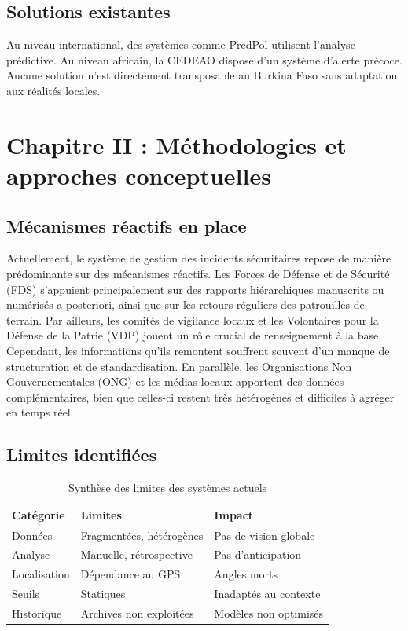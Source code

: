 \documentclass[12pt,a4paper]{article}
\begin{document}
\section{Solutions existantes}
Au niveau international, des systèmes comme PredPol utilisent l'analyse prédictive. Au niveau africain, la CEDEAO dispose d'un système d'alerte précoce. Aucune solution n'est directement transposable au Burkina Faso sans adaptation aux réalités locales.


\newpage
\chapter{Chapitre II : Méthodologies et approches conceptuelles}

\section{Mécanismes réactifs en place}
Actuellement, le système de gestion des incidents sécuritaires repose de manière prédominante sur des mécanismes réactifs. Les Forces de Défense et de Sécurité (FDS) s'appuient principalement sur des rapports hiérarchiques manuscrits ou numérisés a posteriori, ainsi que sur les retours réguliers des patrouilles de terrain. Par ailleurs, les comités de vigilance locaux et les Volontaires pour la Défense de la Patrie (VDP) jouent un rôle crucial de renseignement à la base. Cependant, les informations qu'ils remontent souffrent souvent d'un manque de structuration et de standardisation. En parallèle, les Organisations Non Gouvernementales (ONG) et les médias locaux apportent des données complémentaires, bien que celles-ci restent très hétérogènes et difficiles à agréger en temps réel.

\section{Limites identifiées}
\begin{table}[H]
\centering
\caption{Synthèse des limites des systèmes actuels}
\begin{tabular}{|l|l|l|}
\hline
\textbf{Catégorie} & \textbf{Limites} & \textbf{Impact} \\
\hline
Données & Fragmentées, hétérogènes & Pas de vision globale \\
\hline
Analyse & Manuelle, rétrospective & Pas d'anticipation \\
\hline
Localisation & Dépendance au GPS & Angles morts \\
\hline
Seuils & Statiques & Inadaptés au contexte \\
\hline
Historique & Archives non exploitées & Modèles non optimisés \\
\hline
\end{tabular}
\end{table}
\end{document}
